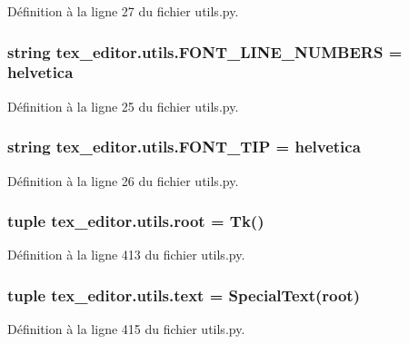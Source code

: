 Définition à la ligne 27 du fichier utils.\+py.

\hypertarget{namespacetex__editor_1_1utils_af2e45f961d243bf5ba03993ad458dcad}{}
\subsubsection[{F\+O\+N\+T\+\_\+\+L\+I\+N\+E\+\_\+\+N\+U\+M\+B\+E\+R\+S}]{\setlength{\rightskip}{0pt plus 5cm}string tex\+\_\+editor.\+utils.\+F\+O\+N\+T\+\_\+\+L\+I\+N\+E\+\_\+\+N\+U\+M\+B\+E\+R\+S = \textquotesingle{}helvetica\textquotesingle{}}\label{namespacetex__editor_1_1utils_af2e45f961d243bf5ba03993ad458dcad}


Définition à la ligne 25 du fichier utils.\+py.

\hypertarget{namespacetex__editor_1_1utils_aa70b755d3969f26880796c74750e3f60}{}
\subsubsection[{F\+O\+N\+T\+\_\+\+T\+I\+P}]{\setlength{\rightskip}{0pt plus 5cm}string tex\+\_\+editor.\+utils.\+F\+O\+N\+T\+\_\+\+T\+I\+P = \textquotesingle{}helvetica\textquotesingle{}}\label{namespacetex__editor_1_1utils_aa70b755d3969f26880796c74750e3f60}


Définition à la ligne 26 du fichier utils.\+py.

\hypertarget{namespacetex__editor_1_1utils_a4b615cf115c5836ca71ec79d5b9caa0f}{}
\subsubsection[{root}]{\setlength{\rightskip}{0pt plus 5cm}tuple tex\+\_\+editor.\+utils.\+root = Tk()}\label{namespacetex__editor_1_1utils_a4b615cf115c5836ca71ec79d5b9caa0f}


Définition à la ligne 413 du fichier utils.\+py.

\hypertarget{namespacetex__editor_1_1utils_ae4fa308d3c65a5223578baf4c1ec4ddd}{}
\subsubsection[{text}]{\setlength{\rightskip}{0pt plus 5cm}tuple tex\+\_\+editor.\+utils.\+text = {\bf Special\+Text}({\bf root})}\label{namespacetex__editor_1_1utils_ae4fa308d3c65a5223578baf4c1ec4ddd}


Définition à la ligne 415 du fichier utils.\+py.

